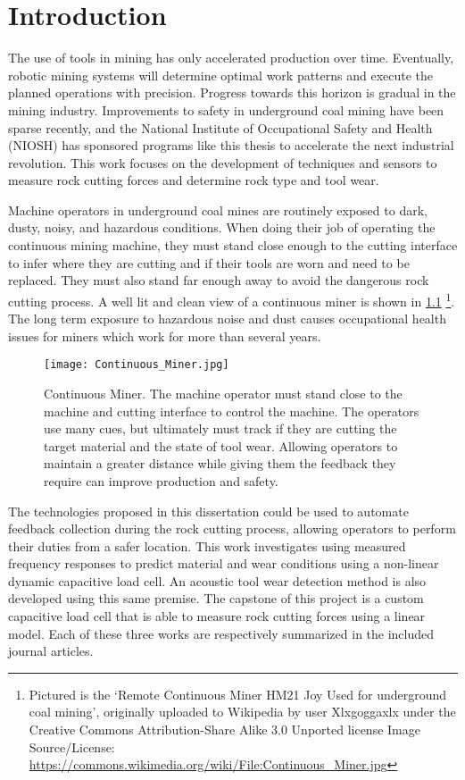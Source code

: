 \chapter{Introduction}\label{chap:1}

The use of tools in mining has only accelerated production over time.
Eventually, robotic mining systems will determine optimal work patterns 
and execute the planned operations with precision.
Progress towards this horizon is gradual in the mining industry.
Improvements to safety in underground coal mining have been sparse recently,
and the National Institute of Occupational Safety and Health (NIOSH) has sponsored
programs like this thesis to accelerate the next industrial revolution.
This work focuses on the development of techniques and sensors 
to measure rock cutting forces and determine rock type and tool wear.

Machine operators in underground coal mines are routinely exposed to dark, dusty, noisy, and
hazardous conditions. When doing their job of operating the continuous mining machine,
they must stand close enough to the cutting interface to infer where they are cutting and 
if their tools are worn and need to be replaced. They must also stand far enough away to avoid
the dangerous rock cutting process. 
A well lit and clean view of a continuous miner is shown in \ref{fig:conminer}
\footnote{Pictured is the `Remote Continuous Miner HM21 Joy Used for underground coal mining',
 originally uploaded to Wikipedia by user Xlxgoggaxlx 
 under the Creative Commons Attribution-Share Alike 3.0 Unported license
Image Source/License: \url{https://commons.wikimedia.org/wiki/File:Continuous_Miner.jpg}}.
 The long term exposure to hazardous noise and dust causes 
occupational health issues for miners which work for more than several years.

\begin{figure}[h]
\centering
\texttt{[image: Continuous\_Miner.jpg]}
\caption{Continuous Miner. 
 The machine operator must stand close to the machine and cutting interface to control the machine.
The operators use many cues, but ultimately must track if they are cutting the target material and 
the state of tool wear. Allowing operators to maintain a greater distance while giving them
the feedback they require can improve production and safety.}
\label{fig:conminer}
\end{figure}

The technologies proposed in this dissertation could be used to automate feedback collection
during the rock cutting process, allowing operators to perform their duties from a safer location.
This work investigates using measured frequency responses to predict material and wear conditions
using a non-linear dynamic capacitive load cell. 
An acoustic tool wear detection method is also developed using this same premise.
The capstone of this project is a custom capacitive load cell that is able to measure 
rock cutting forces using a linear model. 
Each of these three works are respectively summarized in the included journal articles.

